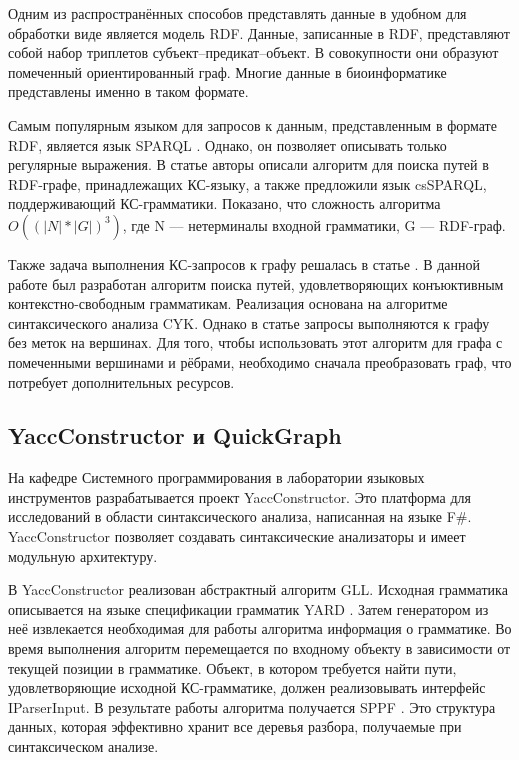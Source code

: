 \documentclass[14pt]{matmex-diploma}
\begin{document}
Одним из распространённых способов представлять данные в удобном для обработки виде является модель RDF. Данные, записанные в RDF, представляют собой набор триплетов субъект--предикат--объект. В совокупности они образуют помеченный ориентированный граф. Многие данные в биоинформатике представлены именно в таком формате.

Самым популярным языком для запросов к данным, представленным в формате RDF, является язык SPARQL \cite{prud2008sparql}. Однако, он позволяет описывать только регулярные выражения. В статье \cite{zhang2016context} авторы описали алгоритм для поиска путей в RDF-графе, принадлежащих КС-языку, а также предложили язык csSPARQL, поддерживающий КС-грамматики. Показано, что сложность алгоритма $O((|N|*|G|)^3)$, где N --- нетерминалы входной грамматики, G --- RDF-граф.

Также задача выполнения КС-запросов к графу решалась в статье  \cite{hellings2014conjunctive}. В данной работе был разработан алгоритм поиска путей, удовлетворяющих конъюктивным контекстно-свободным грамматикам. Реализация основана на алгоритме синтаксического анализа CYK. Однако в статье запросы выполняются к графу без меток на вершинах. Для того, чтобы использовать этот алгоритм для графа с помеченными вершинами и рёбрами, необходимо сначала преобразовать граф, что потребует дополнительных ресурсов.

\subsection{YaccConstructor и QuickGraph}

На кафедре Системного программирования в лаборатории языковых инструментов разрабатывается проект YaccConstructor. Это платформа для исследований в области синтаксического анализа, написанная на языке F\#. YaccConstructor позволяет создавать синтаксические анализаторы и имеет модульную архитектуру.

В YaccConstructor реализован абстрактный алгоритм GLL. Исходная грамматика описывается на языке спецификации грамматик YARD \cite{YARD}. Затем генератором из неё извлекается необходимая для работы алгоритма информация о грамматике. Во время выполнения алгоритм перемещается по входному объекту в зависимости от текущей позиции в грамматике. Объект, в котором требуется найти пути, удовлетворяющие исходной КС-грамматике, должен реализовывать интерфейс IParserInput. В результате работы алгоритма получается SPPF \cite{rekers1992parser}. Это структура данных, которая эффективно хранит все деревья разбора, получаемые при синтаксическом анализе.
\end{document}
